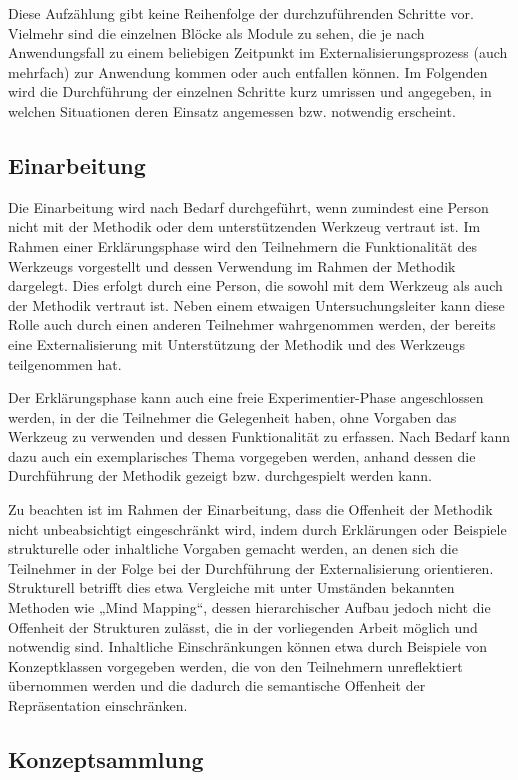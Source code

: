Diese Aufzählung gibt keine Reihenfolge der durchzuführenden Schritte vor. Vielmehr sind die einzelnen Blöcke als Module zu sehen, die je nach Anwendungsfall zu einem beliebigen Zeitpunkt im Externalisierungsprozess (auch mehrfach) zur Anwendung kommen oder auch entfallen können. Im Folgenden wird die Durchführung der einzelnen Schritte kurz umrissen und angegeben, in welchen Situationen deren Einsatz angemessen bzw. notwendig erscheint.

\subsection{Einarbeitung}

Die Einarbeitung wird nach Bedarf durchgeführt, wenn zumindest eine Person nicht mit der Methodik oder dem unterstützenden Werkzeug vertraut ist. Im Rahmen einer Erklärungsphase wird den Teilnehmern die Funktionalität des Werkzeugs vorgestellt und dessen Verwendung im Rahmen der Methodik dargelegt. Dies erfolgt durch eine Person, die sowohl mit dem Werkzeug als auch der Methodik vertraut ist. Neben einem etwaigen Untersuchungsleiter kann diese Rolle auch durch einen anderen Teilnehmer wahrgenommen werden, der bereits eine Externalisierung mit Unterstützung der Methodik und des Werkzeugs teilgenommen hat.

Der Erklärungsphase kann auch eine freie Experimentier-Phase angeschlossen werden, in der die Teilnehmer die Gelegenheit haben, ohne Vorgaben das Werkzeug zu verwenden und dessen Funktionalität zu erfassen. Nach Bedarf kann dazu auch ein exemplarisches Thema vorgegeben werden, anhand dessen die Durchführung der Methodik gezeigt bzw. durchgespielt werden kann.

Zu beachten ist im Rahmen der Einarbeitung, dass die Offenheit der Methodik nicht unbeabsichtigt eingeschränkt wird, indem durch Erklärungen oder Beispiele strukturelle oder inhaltliche Vorgaben gemacht werden, an denen sich die Teilnehmer in der Folge bei der Durchführung der Externalisierung orientieren. Strukturell betrifft dies etwa Vergleiche mit unter Umständen bekannten Methoden wie „Mind Mapping“, dessen hierarchischer Aufbau jedoch nicht die Offenheit der Strukturen zulässt, die in der vorliegenden Arbeit möglich und notwendig sind. Inhaltliche Einschränkungen können etwa durch Beispiele von Konzeptklassen vorgegeben werden, die von den Teilnehmern unreflektiert übernommen werden und die dadurch die semantische Offenheit der Repräsentation einschränken.

\subsection{Konzeptsammlung}

